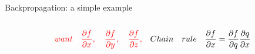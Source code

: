 \documentclass[serif, aspectratio=169]{beamer}
\begin{document}
\begin{frame}{Backpropagation: a simple example}
\begin{columns}
\begin{column}{0.6\textwidth}
\begin{center}
            \end{center}
            
            \[
            \textcolor{red}{ 
            want \quad
            \frac{\partial f}{\partial x}, \quad \frac{\partial f}{\partial y}, \quad
            \frac{\partial f}{\partial z}, \quad
            }
            Chain\quad rule \quad
            \frac{\partial f}{\partial x} =  \frac{\partial f}{\partial q}
            \frac{\partial q}{\partial x}
            \] 
            
        \end{column}

    \end{columns}

\end{frame}
\end{document}
